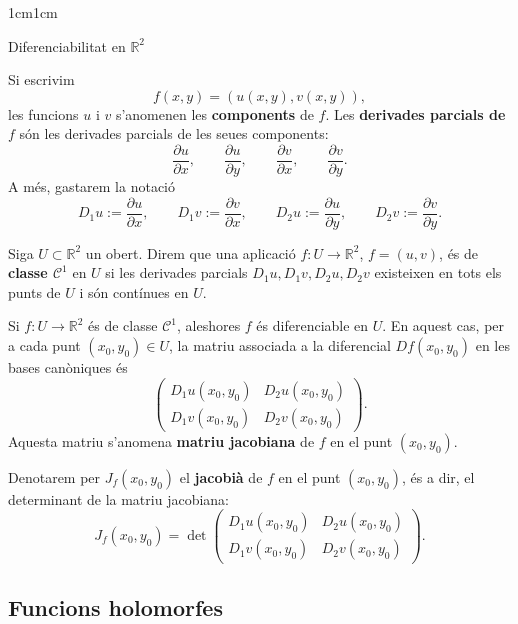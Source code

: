\begin{adjustwidth}{1cm}{1cm}
\begin{subsection}{Diferenciabilitat en \texorpdfstring{$\mathbb{R}^2$}{C} }
\begin{definicio}
Si escrivim
\[
f(x,y)=(u(x,y),v(x,y)),
\]
les funcions $u$ i $v$ s'anomenen les \textbf{components} de $f$. Les \textbf{derivades
parcials de $f$} són les derivades parcials de les seues components:
\[
\frac{\partial u}{\partial x},\qquad
\frac{\partial u}{\partial y},\qquad
\frac{\partial v}{\partial x},\qquad
\frac{\partial v}{\partial y}.
\]
A més, gastarem la notació 
\[
D_1u:=\frac{\partial u}{\partial x},\qquad
D_1v:=\frac{\partial v}{\partial x},\qquad
D_2u:=\frac{\partial u}{\partial y},\qquad
D_2v:=\frac{\partial v}{\partial y}.
\]
\end{definicio}

\begin{definicio}
Siga $U\subset \mathbb{R}^2$ un obert. Direm que una aplicació
$f:U\to\mathbb{R}^2$, $f=(u,v)$, és de \textbf{classe $\mathcal{C}^1$} en $U$ si
les derivades parcials $
D_1u,D_1v,D_2u,D_2v$
existeixen en tots els punts de $U$ i són contínues en $U$.
\end{definicio}

\begin{nota}
Si $f:U\to\mathbb{R}^2$ és de classe $\mathcal{C}^1$, aleshores $f$ és
diferenciable en $U$. En aquest cas, per a cada punt $(x_0,y_0)\in U$, la matriu
associada a la diferencial $Df(x_0,y_0)$ en les bases canòniques és
\[
\begin{pmatrix}
D_1u(x_0,y_0) &
D_2u(x_0,y_0) \\[1.2ex]
D_1v(x_0,y_0) &
D_2v(x_0,y_0)
\end{pmatrix}.
\]
Aquesta matriu s'anomena \textbf{matriu jacobiana} de $f$ en el punt
$(x_0,y_0)$.
\end{nota}

\begin{nota}
Denotarem per $J_f(x_0,y_0)$ el \textbf{jacobià} de $f$ en el punt
$(x_0,y_0)$, és a dir, el determinant de la matriu jacobiana:
\[
J_f(x_0,y_0)=
\det
\begin{pmatrix}
D_1u(x_0,y_0) &
D_2u(x_0,y_0) \\[1.2ex]
D_1v(x_0,y_0) &
D_2v(x_0,y_0)
\end{pmatrix}.
\]

\end{nota}

\end{subsection}

\subsection{Funcions holomorfes}
    

\end{adjustwidth}
